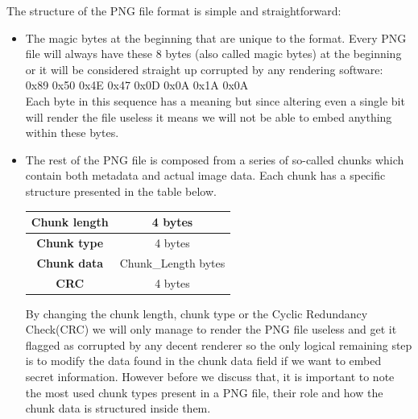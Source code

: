 The structure of the PNG file format is simple and straightforward:
\begin{itemize}
  \item The magic bytes at the beginning that are unique to the format. Every PNG file will always have these 8 bytes (also called magic bytes) at the beginning or it will be considered straight up corrupted by any rendering software:
\\0x89 0x50 0x4E 0x47 0x0D 0x0A 0x1A 0x0A\\
Each byte in this sequence has a meaning but since altering even a single bit will render the file useless it means we will not be able to embed anything within these bytes.
  \item The rest of the PNG file is composed from a series of so-called chunks which contain both metadata and actual image data. Each chunk has a specific structure presented in the table below.
\begin{center}
\begin{tabular}{|c|c|}
\hline
\textbf{Chunk length} & 4 bytes \\ \hline
\textbf{Chunk type} & 4 bytes \\ \hline
\textbf{Chunk data} & Chunk\_Length bytes \\ \hline
\textbf{CRC} & 4 bytes \\ \hline
\end{tabular}
\label{png:chunk-structure}
\end{center}
By changing the chunk length, chunk type or the Cyclic Redundancy Check(CRC) we will only manage to render the PNG file useless and get it flagged as corrupted by any decent renderer so the only logical remaining step is to modify the data found in the chunk data field if we want to embed secret information. However before we discuss that, it is important to note the most used chunk types present in a PNG file, their role and how the chunk data is structured inside them.
\end{itemize}

